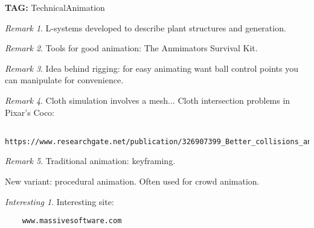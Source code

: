 \documentclass[11pt]{article}
\theoremstyle{remark}
\newtheorem{remark}{Remark}
\newtheorem{interest}{Interesting}
\begin{document}
\textbf{TAG:} TechnicalAnimation

\begin{remark}
	L-systems developed to describe plant structures and generation.
\end{remark}

\begin{remark}
	Tools for good animation: The Anmimators Survival Kit.
\end{remark}

\begin{remark}
	Idea behind rigging: for easy animating want ball control points you can manipulate for convenience.
\end{remark}

\begin{remark}
	Cloth simulation involves a mesh...
	Cloth intersection problems in Pixar's Coco:
	\begin{verbatim}
		https://www.researchgate.net/publication/326907399_Better_collisions_and_faster_cloth_for_Pixar's_Coco
	\end{verbatim}
\end{remark}

\begin{remark}
	Traditional animation: keyframing. 

	New variant: procedural animation. Often used for crowd animation.
\end{remark}

\begin{interest}
	Interesting site:
	\begin{verbatim}
	www.massivesoftware.com
	\end{verbatim}
\end{interest}
\end{document}
